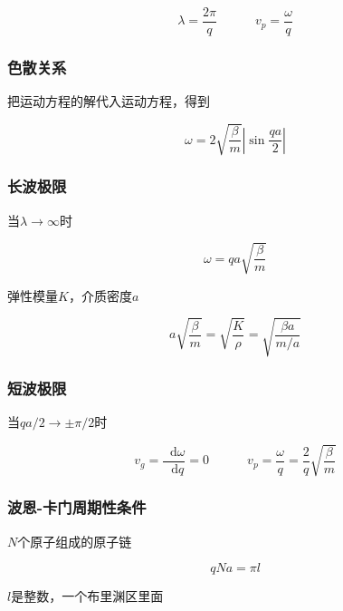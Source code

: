 \documentclass{article}
\newcommand*{\md}{\mathop{}\!\mathrm{d}}
\begin{document}
\begin{multicols}{2}
\begin{equation*}
  \lambda = \dfrac{2\pi}{q} \quad\quad\quad v_p = \dfrac{\omega}{q}
\end{equation*}

\subsubsection{色散关系}

把运动方程的解代入运动方程，得到

\begin{equation*}
  \omega = 2 \sqrt{\dfrac{\beta}{m}} \left| \sin \dfrac{qa}{2} \right|  
\end{equation*}

\subsubsection{长波极限}

当$\lambda \rightarrow \infty$时

\begin{equation*}
  \omega = qa \sqrt{\dfrac{\beta}{m}} 
\end{equation*}

弹性模量$K$，介质密度$a$

\begin{equation*}
  a \sqrt{\dfrac{\beta}{m}} = \sqrt{\dfrac{K}{\rho}} = \sqrt{\dfrac{\beta a}{m/a}}  
\end{equation*}

\subsubsection{短波极限}

当$qa/2 \rightarrow \pm \pi /2$时

\begin{equation*}
  v_g = \dfrac{\md \omega}{\md q} = 0 \quad\quad\quad v_p = \dfrac{\omega}{q} = \dfrac{2}{q} \sqrt{\dfrac{\beta}{m}} 
\end{equation*}

\subsubsection{波恩-卡门周期性条件}

$N$个原子组成的原子链

\begin{equation*}
  qNa = \pi l
\end{equation*}

$l$是整数，一个布里渊区里面


\end{multicols}
\end{document}
